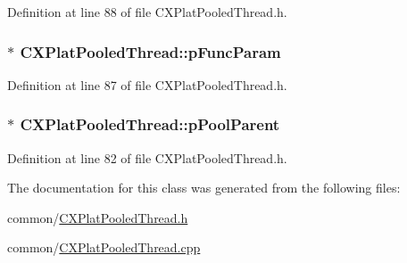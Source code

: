 \-Definition at line 88 of file \-C\-X\-Plat\-Pooled\-Thread.\-h.

\hypertarget{class_c_x_plat_pooled_thread_a76d10e5c387e927b7c3c553673e98a0c}{
\subsubsection[{p\-Func\-Param}]{$\ast$ {\bf \-C\-X\-Plat\-Pooled\-Thread\-::p\-Func\-Param}}}\label{class_c_x_plat_pooled_thread_a76d10e5c387e927b7c3c553673e98a0c}


\-Definition at line 87 of file \-C\-X\-Plat\-Pooled\-Thread.\-h.

\hypertarget{class_c_x_plat_pooled_thread_ad6ceff927d5ff0e06eec0d99aebb1b10}{
\subsubsection[{p\-Pool\-Parent}]{$\ast$ {\bf \-C\-X\-Plat\-Pooled\-Thread\-::p\-Pool\-Parent}}}\label{class_c_x_plat_pooled_thread_ad6ceff927d5ff0e06eec0d99aebb1b10}


\-Definition at line 82 of file \-C\-X\-Plat\-Pooled\-Thread.\-h.



\-The documentation for this class was generated from the following files\-:\begin{DoxyCompactItemize}
\item 
common/\hyperlink{_c_x_plat_pooled_thread_8h}{\-C\-X\-Plat\-Pooled\-Thread.\-h}\item 
common/\hyperlink{_c_x_plat_pooled_thread_8cpp}{\-C\-X\-Plat\-Pooled\-Thread.\-cpp}\end{DoxyCompactItemize}
